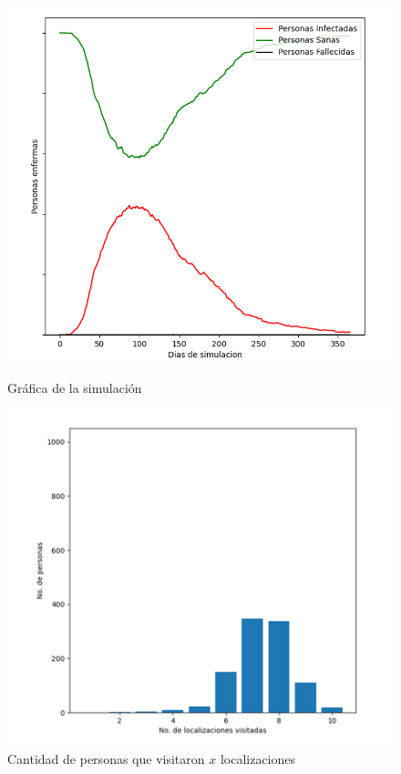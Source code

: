 \begin{figure}[htbp]
    \centering
    \begin{minipage}[t]{0.50\textwidth}
    \centering
    \includegraphics[width=\textwidth]{Graphics/I_M_S_1000.png}
    \caption{Gráfica de la simulación}
    \end{minipage}\hfill
    \begin{minipage}[t]{0.50\textwidth}
    \centering
    \includegraphics[width=\textwidth]{Graphics/Loc_Vist_1000.png}
    \caption{Cantidad de personas que visitaron $x$ localizaciones}
    \end{minipage}
\end{figure}

